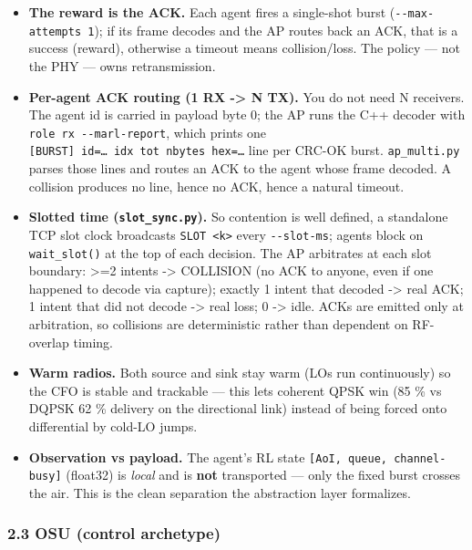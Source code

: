 \documentclass[
  10pt,
]{article}
\providecommand{\tightlist}{%
  \setlength{\itemsep}{0pt}\setlength{\parskip}{0pt}}
\begin{document}
\begin{itemize}
\tightlist
\item
  \textbf{The reward is the ACK.} Each agent fires a single-shot burst
  (\texttt{-\/-max-attempts\ 1}); if its frame decodes and the AP routes
  back an ACK, that is a success (reward), otherwise a timeout means
  collision/loss. The policy --- not the PHY --- owns retransmission.
\item
  \textbf{Per-agent ACK routing (1 RX -\textgreater{} N TX).} You do not
  need N receivers. The agent id is carried in payload byte 0; the AP
  runs the C++ decoder with \texttt{role\ rx\ -\/-marl-report}, which
  prints one
  \texttt{{[}BURST{]}\ id=\ldots{}\ idx\ tot\ nbytes\ hex=\ldots{}} line
  per CRC-OK burst. \texttt{ap\_multi.py} parses those lines and routes
  an ACK to the agent whose frame decoded. A collision produces no line,
  hence no ACK, hence a natural timeout.
\item
  \textbf{Slotted time (\texttt{slot\_sync.py}).} So contention is well
  defined, a standalone TCP slot clock broadcasts
  \texttt{SLOT\ \textless{}k\textgreater{}} every \texttt{-\/-slot-ms};
  agents block on \texttt{wait\_slot()} at the top of each decision. The
  AP arbitrates at each slot boundary: \textgreater=2 intents
  -\textgreater{} COLLISION (no ACK to anyone, even if one happened to
  decode via capture); exactly 1 intent that decoded -\textgreater{}
  real ACK; 1 intent that did not decode -\textgreater{} real loss; 0
  -\textgreater{} idle. ACKs are emitted only at arbitration, so
  collisions are deterministic rather than dependent on RF-overlap
  timing.
\item
  \textbf{Warm radios.} Both source and sink stay warm (LOs run
  continuously) so the CFO is stable and trackable --- this lets
  coherent QPSK win (85 \% vs DQPSK 62 \% delivery on the directional
  link) instead of being forced onto differential by cold-LO jumps.
\item
  \textbf{Observation vs payload.} The agent's RL state
  \texttt{{[}AoI,\ queue,\ channel-busy{]}} (float32) is \emph{local}
  and is \textbf{not} transported --- only the fixed burst crosses the
  air. This is the clean separation the abstraction layer formalizes.
\end{itemize}

\hypertarget{23-osu-control-archetype}{%
\subsubsection{2.3 OSU (control
archetype)}\label{23-osu-control-archetype}}
\end{document}

